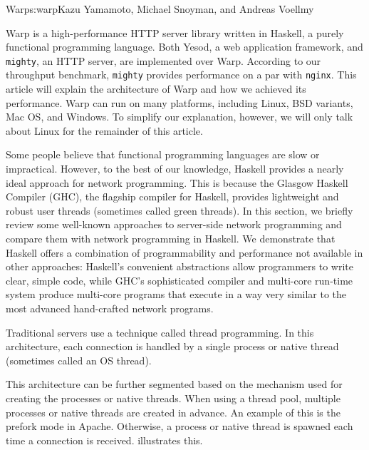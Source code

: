 \begin{aosachapter}{Warp}{s:warp}{Kazu Yamamoto, Michael Snoyman, and Andreas Voellmy}

Warp is a high-performance HTTP server library written in Haskell, a
purely functional programming language. Both Yesod, a web application
framework, and \texttt{mighty}, an HTTP server, are implemented over
Warp. According to our throughput benchmark, \texttt{mighty} provides
performance on a par with \texttt{nginx}. This article will explain the
architecture of Warp and how we achieved its performance. Warp can run
on many platforms, including Linux, BSD variants, Mac OS, and Windows.
To simplify our explanation, however, we will only talk about Linux for
the remainder of this article.


Some people believe that functional programming languages are slow or
impractical. However, to the best of our knowledge, Haskell provides a
nearly ideal approach for network programming. This is because the
Glasgow Haskell Compiler (GHC), the flagship compiler for Haskell,
provides lightweight and robust user threads (sometimes called green
threads). In this section, we briefly review some well-known approaches
to server-side network programming and compare them with network
programming in Haskell. We demonstrate that Haskell offers a combination
of programmability and performance not available in other approaches:
Haskell's convenient abstractions allow programmers to write clear,
simple code, while GHC's sophisticated compiler and multi-core run-time
system produce multi-core programs that execute in a way very similar to
the most advanced hand-crafted network programs.


Traditional servers use a technique called thread programming. In this
architecture, each connection is handled by a single process or native
thread (sometimes called an OS thread).

This architecture can be further segmented based on the mechanism used
for creating the processes or native threads. When using a thread pool,
multiple processes or native threads are created in advance. An example
of this is the prefork mode in Apache. Otherwise, a process or native
thread is spawned each time a connection is received.
 illustrates this.



\end{aosachapter}
